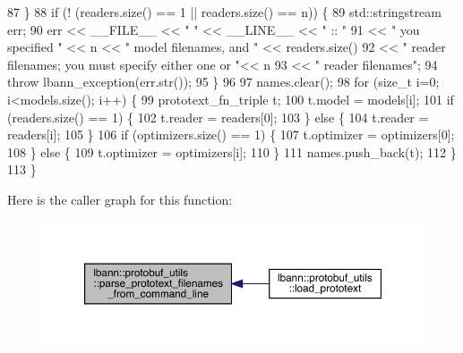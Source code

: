\begin{DoxyCode}
87   \}
88   \textcolor{keywordflow}{if} (! (readers.size() == 1 || readers.size() == n)) \{
89     std::stringstream err;   
90     err << \_\_FILE\_\_ << \textcolor{stringliteral}{" "} << \_\_LINE\_\_ << \textcolor{stringliteral}{" :: "}
91         << \textcolor{stringliteral}{" you specified "} << n << \textcolor{stringliteral}{" model filenames, and "} << readers.size()
92         << \textcolor{stringliteral}{" reader filenames; you must specify either one or "}<< n
93         << \textcolor{stringliteral}{" reader filenames"};
94     \textcolor{keywordflow}{throw} lbann\_exception(err.str());    
95   \}
96 
97   names.clear();
98   \textcolor{keywordflow}{for} (\textcolor{keywordtype}{size\_t} i=0; i<models.size(); i++) \{
99     prototext\_fn\_triple t;
100     t.model = models[i];
101     \textcolor{keywordflow}{if} (readers.size() == 1) \{
102       t.reader = readers[0];  
103     \} \textcolor{keywordflow}{else} \{
104       t.reader = readers[i];  
105     \}
106     \textcolor{keywordflow}{if} (optimizers.size() == 1) \{
107       t.optimizer = optimizers[0];  
108     \} \textcolor{keywordflow}{else} \{
109       t.optimizer = optimizers[i];  
110     \}
111     names.push\_back(t);
112   \}
113 \}
\end{DoxyCode}
Here is the caller graph for this function\+:\nopagebreak
\begin{figure}[H]
\begin{center}
\leavevmode
\includegraphics[width=350pt]{classlbann_1_1protobuf__utils_a690c56a9ac8bcbc883751355b53e0006_icgraph}
\end{center}
\end{figure}
\mbox{\label{classlbann_1_1protobuf__utils_ab8470c35e353af71b04e1e853b99f8ae}} 
